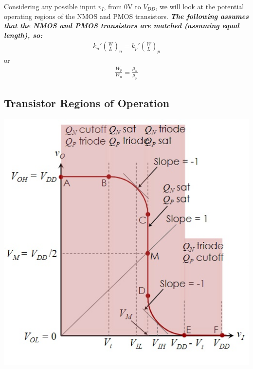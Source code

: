 \documentclass[12pt]{article}
\begin{document}
    Considering any possible input $v_I$, from 0V to $V_{DD}$, we will look at the potential operating regions
    of the NMOS and PMOS transistors. \textit{\textbf{The following assumes that the NMOS and PMOS transistors 
    are matched (assuming equal length), so:}}
    \begin{align*}
        k_n'\left(\frac{W}{L}\right)_n = k_p'\left(\frac{W}{L}\right)_p
    \end{align*}
    or
    \begin{align*}
        \frac{W_p}{W_n} = \frac{\mu_n}{\mu_p}
    \end{align*}

    \subsection*{Transistor Regions of Operation}

    \begin{center}
        \centerline{\includegraphics[scale=0.5]{figures/CMOS_VTC.jpg}}
    \end{center}
    
    
\end{document}
